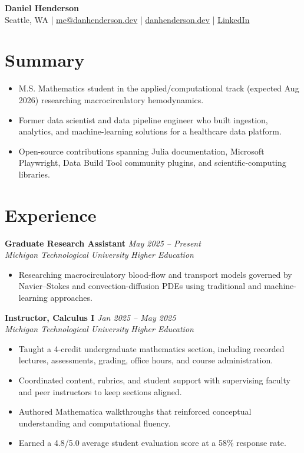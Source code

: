 \documentclass[10pt,letterpaper]{article}
\newcommand{\resumeItem}[1]{\item \small #1}
\newcommand{\resumeLink}[2]{\href{#1}{#2}}
\newcommand{\resumeSubheading}[4]{%
  \textbf{#1} \hfill \small{\textit{#2}}\\
  \small{\textit{#3}} \hfill \small{\textit{#4}}\par
}
\begin{document}
\begin{center}
  {\LARGE \textbf{Daniel Henderson}}\\[3pt]
  \small Seattle, WA \enspace | \enspace \resumeLink{mailto:me@danhenderson.dev}{me@danhenderson.dev}
  \enspace | \enspace \resumeLink{https://www.danhenderson.dev}{danhenderson.dev}
  \enspace | \enspace \resumeLink{https://www.linkedin.com/in/daniel-henderson-6a9485bb/}{LinkedIn}
\end{center}

\section*{Summary}
\begin{itemize}
  \resumeItem{M.S. Mathematics student in the applied/computational track (expected Aug 2026) researching macrocirculatory hemodynamics.}
  \resumeItem{Former data scientist and data pipeline engineer who built ingestion, analytics, and machine-learning solutions for a healthcare data platform.}
  \resumeItem{Open-source contributions spanning Julia documentation, Microsoft Playwright, Data Build Tool community plugins, and scientific-computing libraries.}
\end{itemize}

\section*{Experience}
\resumeSubheading{Graduate Research Assistant}{May 2025 -- Present}{Michigan Technological University}{Higher Education}
\begin{itemize}
  \resumeItem{Researching macrocirculatory blood-flow and transport models governed by Navier--Stokes and convection-diffusion PDEs using traditional and machine-learning approaches.}
\end{itemize}

\resumeSubheading{Instructor, Calculus I}{Jan 2025 -- May 2025}{Michigan Technological University}{Higher Education}
\begin{itemize}
  \resumeItem{Taught a 4-credit undergraduate mathematics section, including recorded lectures, assessments, grading, office hours, and course administration.}
  \resumeItem{Coordinated content, rubrics, and student support with supervising faculty and peer instructors to keep sections aligned.}
  \resumeItem{Authored Mathematica walkthroughs that reinforced conceptual understanding and computational fluency.}
  \resumeItem{Earned a 4.8/5.0 average student evaluation score at a 58\% response rate.}
\end{itemize}
\end{document}
